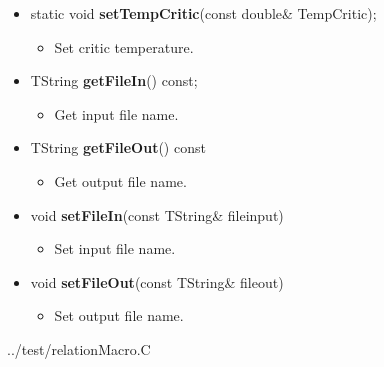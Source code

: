 \begin{itemize}
\begin{itemize}
  \item[] static void \textbf{setTempCritic}(const double\& \textunderscore TempCritic);
    \begin{itemize}
    \item[] Set critic temperature.
    \end{itemize}

  \item[] TString \textbf{getFileIn}() const;
    \begin{itemize}
    \item[] Get input file name.
    \end{itemize}

  \item[] TString \textbf{getFileOut}() const
    \begin{itemize}
    \item[] Get output file name.
    \end{itemize}

  \item[]  void \textbf{setFileIn}(const TString\& file\textunderscore input)
    \begin{itemize}
    \item[] Set input file name.
    \end{itemize}

  \item[] void \textbf{setFileOut}(const TString\& file\textunderscore out)
    \begin{itemize}
    \item[] Set output file name.
    \end{itemize}

  \end{itemize}
\end{itemize}

\newpage


{../test/relationMacro.C}

